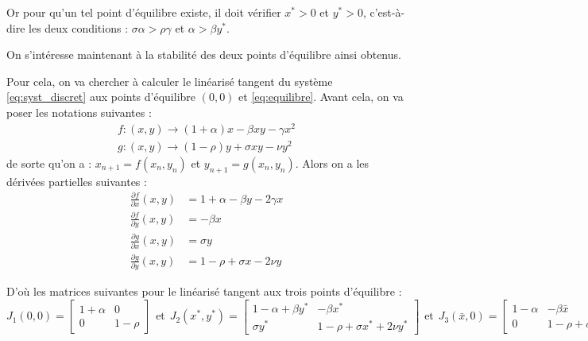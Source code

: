 Or pour qu'un tel point d'équilibre existe, il doit vérifier $x^* > 0$ et $y^* > 0$, c'est-à-dire les deux conditions : $\sigma \alpha > \rho \gamma$ et $\alpha > \beta y^*$.
\vspace{5pt}

On s'intéresse maintenant à la stabilité des deux points d'équilibre ainsi obtenus.

Pour cela, on va chercher à calculer le linéarisé tangent du système \ref{eq:syst_discret} aux points d'équilibre $(0, 0)$ et \ref{eq:equilibre}.
Avant cela, on va poser les notations suivantes :
\begin{align}
    f : (x, y) \rightarrow (1 + \alpha) x - \beta x y - \gamma x^2 \\
    g : (x, y) \rightarrow (1 - \rho) y + \sigma x y - \nu y^2
\end{align}
de sorte qu'on a : $x_{n+1} = f(x_n, y_n)$ et $y_{n+1} = g(x_n, y_n)$.
\newline
Alors on a les dérivées partielles suivantes :
\begin{align}
    \frac{\partial f}{\partial x}(x,y) &= 1 + \alpha - \beta y - 2 \gamma x \\
    \frac{\partial f}{\partial y}(x,y) &= - \beta x \\
    \frac{\partial g}{\partial x}(x,y) &= \sigma y \\
    \frac{\partial g}{\partial y}(x,y) &= 1 - \rho + \sigma x - 2 \nu y 
\end{align}

D'où les matrices suivantes pour le linéarisé tangent aux trois points d'équilibre :
\begin{equation}
    \label{eq:matrices equilibre}
    J_{1}(0,0) = 
  \begin{bmatrix}
    1 + \alpha & 0 \\
    0 & 1 - \rho
  \end{bmatrix}
  \hspace{5pt}
  \text{et}
  \hspace{5pt}
  J_{2}(x^*, y^*) = 
  \begin{bmatrix}
    1 - \alpha + \beta y^* & - \beta x^* \\
    \sigma y^* & 1 - \rho + \sigma x^* + 2 \nu y^*
  \end{bmatrix}
  \hspace{5pt}
  \text{et}
  \hspace{5pt}
  J_{3}(\bar{x}, 0) = 
  \begin{bmatrix}
    1 - \alpha & - \beta \bar{x} \\
    0 & 1 - \rho + \sigma \bar{x}
  \end{bmatrix}
\end{equation}


